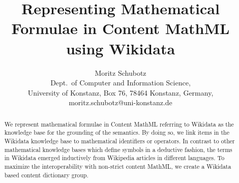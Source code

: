\documentclass[a4paper]{article}
\title{Representing Mathematical Formulae in Content MathML using Wikidata}
\author{Moritz Schubotz \\
 Dept.~of Computer and Information Science,\\
 University of Konstanz, Box 76, 78464 Konstanz, Germany,\\
 moritz.schubotz@uni-konstanz.de
}
\begin{document}
\maketitle

\begin{abstract}
We represent mathematical formulae in Content MathML referring to Wikidata as the knowledge base for the grounding of the semantics.
By doing so, we link items in the Wikidata knowledge base to mathematical identifiers or operators.
In contrast to other mathematical knowledge bases which define symbols in a deductive fashion, the terms in Wikidata emerged inductively from Wikipedia articles in different languages.
To maximize the interoperability with non-strict content MathML, we create a Wikidata based content dictionary group.
\end{abstract}
\end{document}
